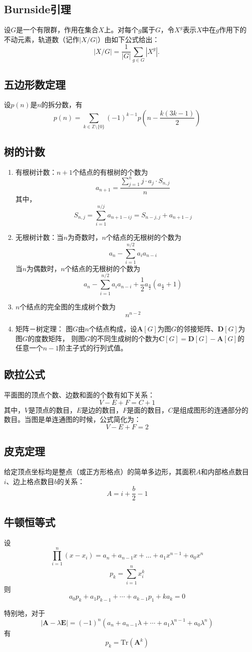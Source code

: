 \subsection{Burnside引理}
	设$G$是一个有限群，作用在集合$X$上。对每个$g$属于$G$，令$X^g$表示$X$中在$g$作用下的不动元素，轨道数（记作$|X/G|$）由如下公式给出：
		$$|X/G| = \frac{1}{|G|}\sum_{g \in G}|X^g|.\,$$
\subsection{五边形数定理}
	设$p(n)$是$n$的拆分数，有$$p(n) = \sum_{k \in \mathbb{Z} \setminus \{0\}} (-1)^{k - 1} p\left(n - \frac{k(3k - 1)}{2}\right)$$
\subsection{树的计数}
	\begin{enumerate}
		\item 有根树计数：$n+1$个结点的有根树的个数为
			$$a_{n+1} = \frac{\sum_{j=1}^{n}{j \cdot a_j \cdot{S_{n, j}}}}{n}$$
		其中，
			$$S_{n, j} = \sum_{i=1}^{n/j}{a_{n+1-ij}} = S_{n-j, j} + a_{n+1-j}$$
		\item 无根树计数：当$n$为奇数时，$n$个结点的无根树的个数为
			$$a_n-\sum_{i=1}^{n/2}{a_ia_{n-i}}$$
		当$n$为偶数时，$n$个结点的无根树的个数为
			$$a_n-\sum_{i=1}^{n/2}{a_ia_{n-i}}+\frac{1}{2}a_{\frac{n}{2}}(a_{\frac{n}{2}}+1)$$
		\item $n$个结点的完全图的生成树个数为
			$$n^{n-2}$$
		\item 矩阵－树定理：
		图$G$由$n$个结点构成，设$\bm{A}[G]$为图$G$的邻接矩阵、$\bm{D}[G]$为图$G$的度数矩阵，
		则图$G$的不同生成树的个数为$\bm{C}[G] = \bm{D}[G] - \bm{A}[G]$的任意一个$n-1$阶主子式的行列式值。
	\end{enumerate}
\subsection{欧拉公式}
	平面图的顶点个数、边数和面的个数有如下关系：
		$$V - E + F = C+ 1$$
	\indent 其中，$V$是顶点的数目，$E$是边的数目，$F$是面的数目，$C$是组成图形的连通部分的数目。当图是单连通图的时候，公式简化为：
		$$V - E + F = 2$$
\subsection{皮克定理}
	给定顶点坐标均是整点（或正方形格点）的简单多边形，其面积$A$和内部格点数目$i$、边上格点数目$b$的关系：
		$$A = i + \frac{b}{2} - 1$$
\subsection{牛顿恒等式}
	设$$\prod_{i = 1}^n{(x - x_i)} = a_n + a_{n - 1} x + \dots + a_1 x^{n - 1} + a_0 x^n$$
	$$p_k = \sum_{i = 1}^n{x_i^k}$$
	则$$a_0 p_k + a_1 p_{k - 1} + \cdots + a_{k - 1} p_1 + k a_k = 0$$\par
	特别地，对于$$|\bm{A} - \lambda \bm{E}| = (-1)^n(a_n + a_{n - 1} \lambda + \cdots + a_1 \lambda^{n - 1} + a_0 \lambda^n)$$
	有$$p_k = \mathrm{Tr}(\bm{A}^k)$$
